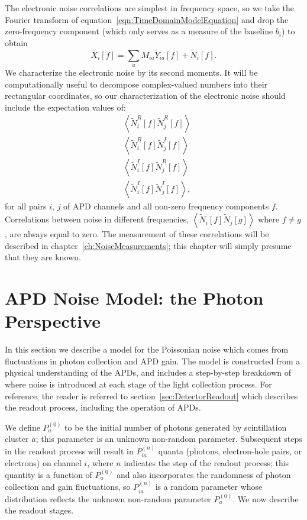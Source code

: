 The electronic noise correlations are simplest in frequency space, so we take the Fourier transform of equation~\ref{eqn:TimeDomainModelEquation} and drop the zero-frequency component (which only serves as a measure of the baseline $b_i$) to obtain
\begin{equation}\label{FrequencyDomainModelEquation}
\widetilde{X}_i[f] = \sum_a M_{ia}\widetilde{Y}_{ia}[f] + \widetilde{N}_i[f].
\end{equation}
We characterize the electronic noise by its second moments.  It will be computationally useful to decompose complex-valued numbers into their rectangular coordinates, so our characterization of the electronic noise should include the expectation values of:
\begin{subequations}\label{eq:FirstStatementOfNoiseCorrelations}\begin{align}
&\left< \widetilde{N}^R_i[f]\widetilde{N}^R_j[f] \right> \\
&\left< \widetilde{N}^R_i[f]\widetilde{N}^I_j[f] \right> \\
&\left< \widetilde{N}^I_i[f]\widetilde{N}^R_j[f] \right> \\
&\left< \widetilde{N}^I_i[f]\widetilde{N}^I_j[f] \right>,
\end{align}\end{subequations}
for all pairs $i$, $j$ of APD channels and all non-zero frequency components $f$.  Correlations between noise in different frequencies, $\left<\widetilde{N}_i[f]\widetilde{N}_j[g]\right>$ where $f \ne g$, are always equal to zero.  The measurement of these correlations will be described in chapter~\ref{ch:NoiseMeasurements}; this chapter will simply presume that they are known.

\section{APD Noise Model: the Photon Perspective}\label{sec:DescriptionOfPhotonNoise}

In this section we describe a model for the Poissonian noise which comes from fluctuations in photon collection and APD gain.  The model is constructed from a physical understanding of the APDs, and includes a step-by-step breakdown of where noise is introduced at each stage of the light collection process.  For reference, the reader is referred to section~\ref{sec:DetectorReadout} which describes the readout process, including the operation of APDs.

We define $P_a^{(0)}$ to be the initial number of photons generated by scintillation cluster $a$; this parameter is an unknown non-random parameter.  Subsequent steps in the readout process will result in $P_{ia}^{(n)}$ quanta (photons, electron-hole pairs, or electrons) on channel $i$, where $n$ indicates the step of the readout process; this quantity is a function of $P_a^{(0)}$ and also incorporates the randomness of photon collection and gain fluctuations, so $P_{ia}^{(n)}$ is a random parameter whose distribution reflects the unknown non-random parameter $P_a^{(0)}$.  We now describe the readout stages.

